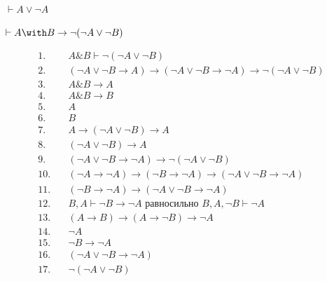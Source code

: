 \begin{exercise}[4.a]
    \(\vdash A \lor \neg A\)
\end{exercise}

\begin{exercise}[4.b]
    \(\vdash A \with B \to \neg (\neg A \lor \neg B)\)

    \begin{align*}
        1.\quad  & A\&B \vdash \neg (\neg A  \lor \neg B) \tag{т. о дедукции}                                                    \\
        2.\quad  & (\neg A  \lor \neg B \to A) \to (\neg A  \lor \neg B  \to \neg A) \to  \neg (\neg A  \lor \neg B) \tag{акс.9} \\
        3.\quad  & A\&B \to A \tag{акс. 4}                                                                                       \\
        4.\quad  & A\&B \to B \tag{акс. 5}                                                                                       \\
        5.\quad  & A \tag{M.P. 3, 1}                                                                                             \\
        6.\quad  & B \tag{M.P. 4, 1}                                                                                             \\
        7.\quad  & A \to (\neg A  \lor \neg B) \to A \tag{акс.1}                                                                 \\
        8.\quad  & (\neg A  \lor \neg B) \to A \tag{M.P. 7, 5}                                                                   \\
        9.\quad  & (\neg A  \lor \neg B  \to \neg A) \to  \neg (\neg A  \lor \neg B) \tag{M.P. 2, 8}                             \\
        10.\quad & (\neg A \to \neg A) \to (\neg B \to \neg A) \to (\neg A  \lor \neg B \to \neg A) \tag{акс. 8}                 \\
        11.\quad & (\neg B \to \neg A) \to (\neg A  \lor \neg B \to \neg A) \tag{M.P. 8 и известный факт}                        \\
        12.\quad & B, A \vdash \neg B \to \neg A \text{ равносильно } B, A, \neg B \vdash \neg A \tag{т. о дедукции}             \\
        13.\quad & (A \to B) \to (A \to \neg B) \to \neg A \tag{акс.9}                                                           \\
        14.\quad & \neg A \tag{дважды аксиома 1 из \(B\) и \(\neg B\)}                                                           \\
        15.\quad & \neg B \to \neg A \tag{доказали по дедукции}                                                                  \\
        16.\quad & (\neg A  \lor \neg B \to \neg A) \tag{M.P. 11, 15}                                                            \\
        17.\quad & \neg (\neg A  \lor \neg B) \tag{M.P. 9, 16}
    \end{align*}


\end{exercise}
